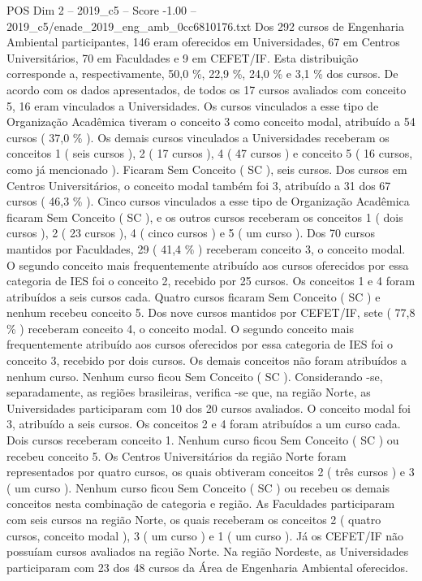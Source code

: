 \begin{textsample}{POS Dim 2 – 2019\_c5 – Score -1.00 – 2019\_c5/enade\_2019\_eng\_amb\_0cc6810176.txt}
Dos 292 cursos de Engenharia Ambiental participantes, 146 eram oferecidos em Universidades, 67 em Centros Universitários, 70 em Faculdades e 9 em CEFET/IF.
Esta distribuição corresponde a, respectivamente, 50,0 \%, 22,9 \%, 24,0 \% e 3,1 \% dos cursos.
De acordo com os dados apresentados, de todos os 17 cursos avaliados com conceito 5, 16 eram vinculados a Universidades.
Os cursos vinculados a esse tipo de Organização Acadêmica tiveram o conceito 3 como conceito modal, atribuído a 54 cursos ( 37,0 \% ).
Os demais cursos vinculados a Universidades receberam os conceitos 1 ( seis cursos ), 2 ( 17 cursos ), 4 ( 47 cursos ) e conceito 5 ( 16 cursos, como já mencionado ).
Ficaram Sem Conceito ( SC ), seis cursos.
Dos cursos em Centros Universitários, o conceito modal também foi 3, atribuído a 31 dos 67 cursos ( 46,3 \% ).
Cinco cursos vinculados a esse tipo de Organização Acadêmica ficaram Sem Conceito ( SC ), e os outros cursos receberam os conceitos 1 ( dois cursos ), 2 ( 23 cursos ), 4 ( cinco cursos ) e 5 ( um curso ).
Dos 70 cursos mantidos por Faculdades, 29 ( 41,4 \% ) receberam conceito 3, o conceito modal.
O segundo conceito mais frequentemente atribuído aos cursos oferecidos por essa categoria de IES foi o conceito 2, recebido por 25 cursos.
Os conceitos 1 e 4 foram atribuídos a seis cursos cada.
Quatro cursos ficaram Sem Conceito ( SC ) e nenhum recebeu conceito 5.
Dos nove cursos mantidos por CEFET/IF, sete ( 77,8 \% ) receberam conceito 4, o conceito modal.
O segundo conceito mais frequentemente atribuído aos cursos oferecidos por essa categoria de IES foi o conceito 3, recebido por dois cursos.
Os demais conceitos não foram atribuídos a nenhum curso.
Nenhum curso ficou Sem Conceito ( SC ).
Considerando -se, separadamente, as regiões brasileiras, verifica -se que, na região Norte, as Universidades participaram com 10 dos 20 cursos avaliados.
O conceito modal foi 3, atribuído a seis cursos.
Os conceitos 2 e 4 foram atribuídos a um curso cada.
Dois cursos receberam conceito 1.
Nenhum curso ficou Sem Conceito ( SC ) ou recebeu conceito 5.
Os Centros Universitários da região Norte foram representados por quatro cursos, os quais obtiveram conceitos 2 ( três cursos ) e 3 ( um curso ).
Nenhum curso ficou Sem Conceito ( SC ) ou recebeu os demais conceitos nesta combinação de categoria e região.
As Faculdades participaram com seis cursos na região Norte, os quais receberam os conceitos 2 ( quatro cursos, conceito modal ), 3 ( um curso ) e 1 ( um curso ).
Já os CEFET/IF não possuíam cursos avaliados na região Norte.
Na região Nordeste, as Universidades participaram com 23 dos 48 cursos da Área de Engenharia Ambiental oferecidos.

\end{textsample}
